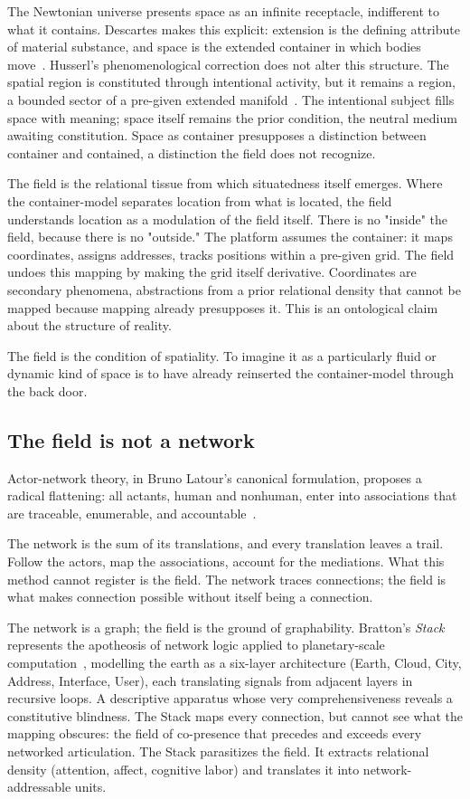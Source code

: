 The Newtonian universe presents space as an infinite receptacle, indifferent to what it contains. Descartes makes this explicit: extension is the defining attribute of material substance, and space is the extended container in which bodies move~\cite{descartes1644}. Husserl's phenomenological correction does not alter this structure. The spatial region is constituted through intentional activity, but it remains a region, a bounded sector of a pre-given extended manifold~\cite{husserl1913}. The intentional subject fills space with meaning; space itself remains the prior condition, the neutral medium awaiting constitution. Space as container presupposes a distinction between container and contained, a distinction the field does not recognize.

The field is the relational tissue from which situatedness itself emerges. Where the container-model separates location from what is located, the field understands location as a modulation of the field itself. There is no "inside" the field, because there is no "outside." The platform assumes the container: it maps coordinates, assigns addresses, tracks positions within a pre-given grid. The field undoes this mapping by making the grid itself derivative. Coordinates are secondary phenomena, abstractions from a prior relational density that cannot be mapped because mapping already presupposes it. This is an ontological claim about the structure of reality.

The field is the condition of spatiality. To imagine it as a particularly fluid or dynamic kind of space is to have already reinserted the container-model through the back door.

\subsection{The field is not a network}

Actor-network theory, in Bruno Latour's canonical formulation, proposes a radical flattening: all actants, human and nonhuman, enter into associations that are traceable, enumerable, and accountable~\cite{latour2005}.

The network is the sum of its translations, and every translation leaves a trail. Follow the actors, map the associations, account for the mediations. What this method cannot register is the field. The network traces connections; the field is what makes connection possible without itself being a connection.

The network is a graph; the field is the ground of graphability. Bratton's \emph{Stack} represents the apotheosis of network logic applied to planetary-scale computation~\cite{bratton2016}, modelling the earth as a six-layer architecture (Earth, Cloud, City, Address, Interface, User), each translating signals from adjacent layers in recursive loops. A descriptive apparatus whose very comprehensiveness reveals a constitutive blindness. The Stack maps every connection, but cannot see what the mapping obscures: the field of co-presence that precedes and exceeds every networked articulation. The Stack parasitizes the field. It extracts relational density (attention, affect, cognitive labor) and translates it into network-addressable units.

